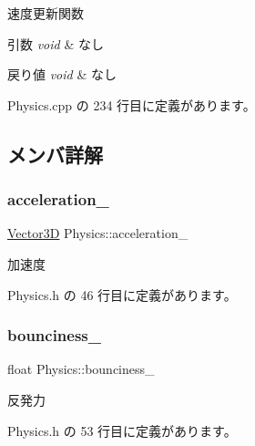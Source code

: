 速度更新関数 


\begin{DoxyParams}{引数}
{\em void} & なし \\
\hline
\end{DoxyParams}

\begin{DoxyRetVals}{戻り値}
{\em void} & なし \\
\hline
\end{DoxyRetVals}


 Physics.\+cpp の 234 行目に定義があります。



\subsection{メンバ詳解}
\mbox{\label{class_physics_a8e87f3c364d5d0b8d3fb228237f3ff56}} 
\subsubsection{\texorpdfstring{acceleration\+\_\+}{acceleration\_}}
{\footnotesize\ttfamily \mbox{\hyperlink{class_vector3_d}{Vector3D}} Physics\+::acceleration\+\_\+\hspace{0.3cm}{\ttfamily [private]}}



加速度 



 Physics.\+h の 46 行目に定義があります。

\mbox{\label{class_physics_a302b8ad7552303570fa1cfd070bb8588}} 
\subsubsection{\texorpdfstring{bounciness\+\_\+}{bounciness\_}}
{\footnotesize\ttfamily float Physics\+::bounciness\+\_\+\hspace{0.3cm}{\ttfamily [private]}}



反発力 



 Physics.\+h の 53 行目に定義があります。

